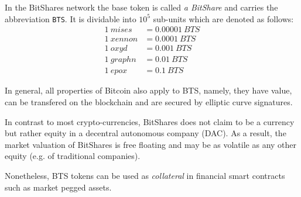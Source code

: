 In the BitShares network the base token is called \emph{a BitShare} and carries
the abbreviation \texttt{BTS}. It is dividable into $10^5$ sub-units which are
denoted as follows:
\begin{align*}
\SI{1}{mises } &= \SI{0.00001}{BTS}\\
\SI{1}{xennon} &= \SI{0.0001}{BTS}\\
\SI{1}{oxyd  } &= \SI{0.001}{BTS}\\
\SI{1}{graphn} &= \SI{0.01}{BTS}\\
\SI{1}{epox  } &= \SI{0.1}{BTS}
\end{align*}

In general, all properties of Bitcoin also apply to BTS, namely, they have
value, can be transfered on the blockchain and are secured by elliptic curve
signatures.

In contrast to most crypto-currencies, BitShares does not claim to be a currency
but rather equity in a decentral autonomous company (DAC). As a result, the
market valuation of BitShares is free floating and may be as volatile as any
other equity (e.g. of traditional companies).

Nonetheless, BTS tokens can be used as \emph{collateral} in financial smart
contracts~\cite{bts:financial} such as market pegged assets.

